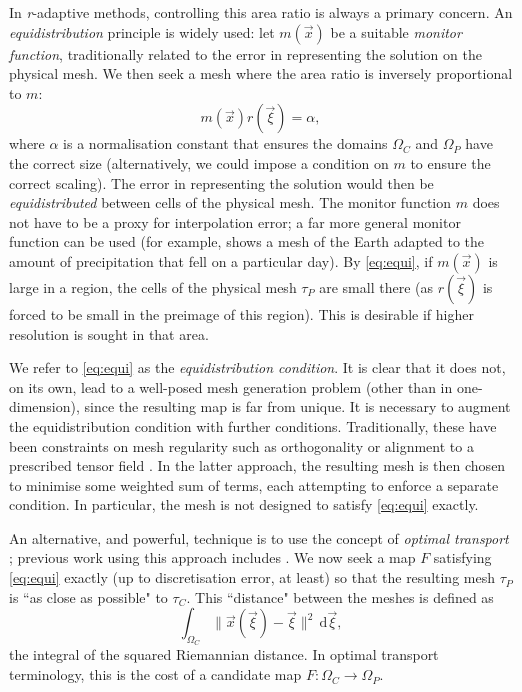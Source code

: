 \documentclass[11pt, a4paper]{scrartcl}  %
\theoremstyle{plain}
\theoremstyle{definition}
\numberwithin{equation}{section}
\begin{document}
In \emph{r}-adaptive methods, controlling this area ratio is always a
primary concern. An \emph{equidistribution} principle is widely used:
let $m(\vec{x})$ be a suitable \emph{monitor function}, traditionally
related to the error in representing the solution on the physical mesh.
We then seek a mesh where the area ratio is inversely proportional to
$m$:
\begin{equation}
  \label{eq:equi}
  m(\vec{x}) r(\vec{\xi}) = \alpha,
\end{equation}
where $\alpha$ is a normalisation constant that ensures the domains
$\Omega_C$ and $\Omega_P$ have the correct size (alternatively, we could
impose a condition on $m$ to ensure the correct scaling). The error in
representing the solution would then be \emph{equidistributed} between
cells of the physical mesh. The monitor function $m$ does not have to be
a proxy for interpolation error; a far more general monitor function can
be used (for example, \citet{weller2016mesh} shows a mesh of the Earth
adapted to the amount of precipitation that fell on a particular day).
By \cref{eq:equi}, if $m(\vec{x})$ is large in a region, the cells of
the physical mesh $\tau_P$ are small there (as $r(\vec{\xi})$ is forced
to be small in the preimage of this region). This is desirable if higher
resolution is sought in that area.

We refer to \cref{eq:equi} as the \emph{equidistribution condition}. It
is clear that it does not, on its own, lead to a well-posed mesh
generation problem (other than in one-dimension), since the resulting
map is far from unique. It is necessary to augment the equidistribution
condition with further conditions. Traditionally, these have been
constraints on mesh regularity such as orthogonality
\citep{thompson1998handbook} or alignment to a prescribed tensor field
\citep{huang2011adaptive}. In the latter approach, the resulting mesh is
then chosen to minimise some weighted sum of terms, each attempting to
enforce a separate condition. In particular, the mesh is not designed to
satisfy \cref{eq:equi} exactly.

An alternative, and powerful, technique is to use the concept of
\emph{optimal transport} \citep{villani2003topics,villani2009optimal};
previous work using this approach includes \citet{budd2006parabolic,
budd2009moving,chacon2011robust,browne2014fast}. We now seek a map $F$
satisfying \cref{eq:equi} exactly (up to discretisation error, at least)
so that the resulting mesh $\tau_P$ is ``as close as possible" to
$\tau_C$. This ``distance" between the meshes is defined as
\begin{equation}
  \int_{\Omega_C} \|\vec{x}(\vec{\xi}) - \vec{\xi}\|^2 \,\mathrm{d}\vec{\xi},
\end{equation}
the integral of the squared Riemannian distance. In optimal transport
terminology, this is the cost of a candidate map $F: \Omega_C \to \Omega_P$.
\end{document}
